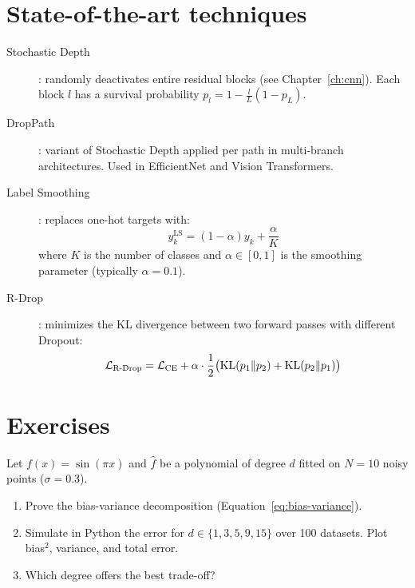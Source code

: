\section{State-of-the-art techniques}
\label{sec:reg-sota}

\begin{sota}[title=\textbf{Modern regularization techniques}]
\begin{description}
  \item[Stochastic Depth] \cite{huang2016deep}: randomly deactivates
    entire residual blocks (see Chapter~\ref{ch:cnn}). Each block
    $l$ has a survival probability $p_l = 1 - \frac{l}{L}(1 - p_L)$.

  \item[DropPath]: variant of Stochastic Depth applied per path
    in multi-branch architectures. Used in EfficientNet and
    Vision Transformers.

  \item[Label Smoothing] \cite{szegedy2016rethinking}: replaces one-hot
    targets with:
    \begin{equation}
      y_k^{\text{LS}} = (1 - \alpha) y_k + \frac{\alpha}{K}
    \end{equation}
    where $K$ is the number of classes and $\alpha \in [0, 1]$ is the
    smoothing parameter (typically $\alpha = 0.1$).

  \item[R-Drop] \cite{wu2021r}: minimizes the KL divergence between two
    forward passes with different Dropout:
    \begin{equation}
      \mathcal{L}_{\text{R-Drop}} = \mathcal{L}_{\text{CE}}
        + \alpha \cdot \frac{1}{2}\bigl(\mathrm{KL}(p_1 \| p_2) + \mathrm{KL}(p_2 \| p_1)\bigr)
    \end{equation}
\end{description}
\end{sota}

\section{Exercises}
\label{sec:reg-exercises}

\begin{exercise}
Let $f(x) = \sin(\pi x)$ and $\hat{f}$ be a polynomial of degree $d$ fitted
on $N = 10$ noisy points ($\sigma = 0.3$).
\begin{enumerate}
  \item Prove the bias-variance decomposition (Equation~\ref{eq:bias-variance}).
  \item Simulate in Python the error for $d \in \{1, 3, 5, 9, 15\}$ over 100
    datasets. Plot bias$^2$, variance, and total error.
  \item Which degree offers the best trade-off?
\end{enumerate}
\end{exercise}

